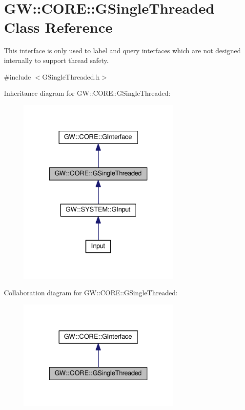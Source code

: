 \hypertarget{classGW_1_1CORE_1_1GSingleThreaded}{}\section{GW\+:\+:C\+O\+RE\+:\+:G\+Single\+Threaded Class Reference}
\label{classGW_1_1CORE_1_1GSingleThreaded}


This interface is only used to label and query interfaces which are not designed internally to support thread safety.  




{\ttfamily \#include $<$G\+Single\+Threaded.\+h$>$}



Inheritance diagram for GW\+:\+:C\+O\+RE\+:\+:G\+Single\+Threaded\+:\nopagebreak
\begin{figure}[H]
\begin{center}
\leavevmode
\includegraphics[width=230pt]{classGW_1_1CORE_1_1GSingleThreaded__inherit__graph}
\end{center}
\end{figure}


Collaboration diagram for GW\+:\+:C\+O\+RE\+:\+:G\+Single\+Threaded\+:\nopagebreak
\begin{figure}[H]
\begin{center}
\leavevmode
\includegraphics[width=230pt]{classGW_1_1CORE_1_1GSingleThreaded__coll__graph}
\end{center}
\end{figure}

